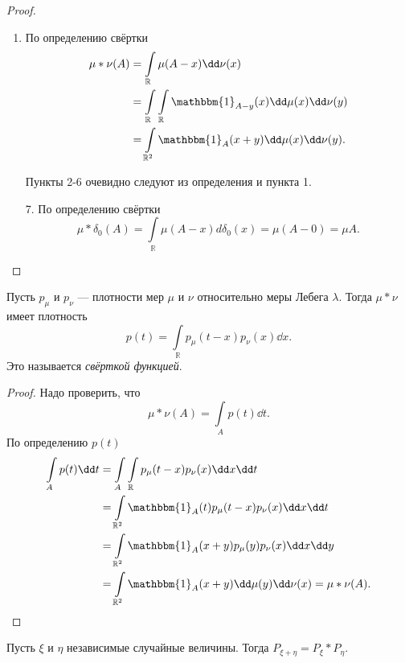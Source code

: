       \begin{proof}
\enewline
         \begin{enumerate}
             \item По определению свёртки
             \begin{align*}
                 \mu * \nu(A) &= \int\limits_\mathbb{R} \mu(A - x) \dd\nu(x) \\&= \int\limits_{\mathbb{R}}\int\limits_\mathbb{R} \mathbbm{1}_{A - y}(x) \dd\mu(x)\dd\nu(y) \\&= \int\limits_{\mathbb{R}^2}\mathbbm{1}_A (x + y) \dd\mu(x)\dd\nu(y).
             \end{align*}
             \item[] Пункты 2-6 очевидно следуют из определения и пункта 1.
             \item[7.] По определению свёртки
             $$\mu*\delta_0 (A) = \int\limits_\mathbb{R} \mu(A - x)d\delta_0(x) =  \mu (A - 0) = \mu A.$$ \qedhere
         \end{enumerate}
                       
\end{proof}

     \begin{theorem}
         Пусть $p_\mu$ и $p_\nu$ --- плотности мер $\mu$ и $\nu$ относительно меры Лебега $\lambda$.
         Тогда $\mu*\nu$ имеет плотность
         $$p(t) = \int\limits_\mathbb{R} p_\mu (t - x) p_\nu (x) \dd x.$$
         Это называется \textit{свёрткой функцией}.
     \end{theorem}

     \begin{proof}
        Надо проверить, что 
        $$\mu*\nu(A) = \int\limits_A p(t)\dd t.$$ 
        По определению $p(t)$
        \begin{align*}
            \int\limits_A p(t)\dd t &= \int\limits_A\int\limits_\mathbb{R} p_\mu(t - x)p_\nu(x)\dd x\dd t \\&= \int\limits_{\mathbb{R}^2}\mathbbm{1}_A(t)p_\mu(t-x)p_\nu(x) \dd x\dd t \\&= \int\limits_{\mathbb{R}^2}\mathbbm{1}_A(x+y)p_\mu(y)p_\nu(x)\dd x\dd y \\&= \int\limits_{\mathbb{R}^2} \mathbbm{1}_A(x+y) \dd\mu(y)\dd\nu(x) = \mu*\nu(A).
        \end{align*}
       
     \end{proof}

     \begin{theorem}

        Пусть $\xi$ и $\eta$ независимые случайные величины. Тогда $P_{\xi + \eta} = P_\xi * P_\eta$.
     \end{theorem}

